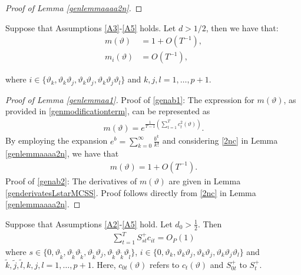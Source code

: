 {{\begin{proof}[Proof of Lemma \ref{genlemmaaaa2n}]
\end{proof}

\begin{lemma} \label{genlemmaa1} Suppose that Assumptions \ref{A3}-\ref{A5} holds. Let $d > 1/2$, then we have that:
\begin{align}
    m(\vartheta) &= 1 + O(T^{-1}), \label{genab1} \\
    m_{i}(\vartheta) &=   O(T^{-1}), \label{genab2} 
\end{align}
\end{lemma}
where $i \in \{\vartheta_k,\vartheta_k \vartheta_j, \vartheta_k \vartheta_j,\vartheta_k \vartheta_j \vartheta_l \}$ and $k,j,l = 1,\ldots, p+1$.
\begin{proof}[Proof of Lemma \ref{genlemmaa1}] Proof of \eqref{genab1}: The expression for $m(\vartheta)$, as provided in \eqref{genmodificationterm}, can be represented as 
\begin{align*}
    m(\vartheta) =  e^{\frac{1}{T-1} \left( \sum_{t = 1}^T c^2_t(\vartheta)  \right)}.
\end{align*}
By employing the expansion $e^{b} = \sum_{k = 0}^{\infty} \frac{b^k}{k !}$ and considering \eqref{2nc} in Lemma \ref{genlemmaaaa2n}, we have that
\begin{align*}
     m(\vartheta) = 1 + O\left(T^{-1}\right).
\end{align*}
Proof of \eqref{genab2}: The derivatives of $m(\vartheta)$ are given in Lemma \ref{genderivatesLstarMCSS}. Proof follows directly from \eqref{2nc} in Lemma \ref{genlemmaaaa2n}. 
\end{proof}

\begin{lemma} \label{genlemmaa99n}
Suppose that Assumptions \ref{A2}-\ref{A5} hold. Let $d_0 > \frac{1}{2}$. Then
\begin{align} 
    \sum_{t = 1}^T S_{st}^+ c_{it} = O_{P}(1) \label{qwn1} 
\end{align}
where $s \in \{0,\vartheta_{\tilde{k}},\vartheta_{\tilde{k}} \vartheta_{\tilde{k}}, \vartheta_{\tilde{k}} \vartheta_j,\vartheta_{\tilde{k}} \vartheta_{\tilde{k}} \vartheta_{\tilde{l}} \}$, $i \in \{0,\vartheta_k,\vartheta_k \vartheta_j, \vartheta_k \vartheta_j,\vartheta_k \vartheta_j \vartheta_l \}$ and $\tilde{k},\tilde{j},\tilde{l},k,j,l = 1,\ldots, p+1$. Here, $c_{0t}(\vartheta)$ refers to $c_{t}(\vartheta)$ and $S_{0t}^+$ to $S_{t}^+$. 
\end{lemma}



}}
